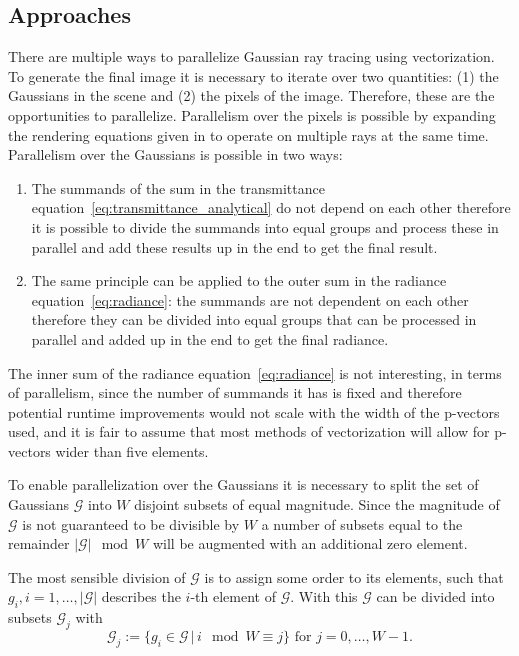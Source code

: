 \documentclass[a4paper, 11pt]{memoir}
\begin{document}
    \subsection{Approaches}
    There are multiple ways to parallelize Gaussian ray tracing using vectorization. To generate the final image it is necessary to iterate
    over two quantities: (1) the Gaussians in the scene and (2) the pixels of the image. Therefore, these are the opportunities to parallelize.
    Parallelism over the pixels is possible by expanding the rendering equations given in \cite{Rhodin:2015} to operate on multiple rays at the
    same time. Parallelism over the Gaussians is possible in two ways:
    \begin{enumerate}
        \item The summands of the sum in the \gls{transmittance} equation~\eqref{eq:transmittance_analytical} do not depend on each
            other therefore it is possible to divide the summands into equal groups and process these in parallel
            and add these results up in the end to get the final result.
        \item The same principle can be applied to the outer sum in the \gls{radiance} equation~\eqref{eq:radiance}: the summands are
            not dependent on each other therefore they can be divided into equal groups that can
            be processed in parallel and added up in the end to get the final \gls{radiance}.
    \end{enumerate}
    The inner sum of the \gls{radiance} equation~\eqref{eq:radiance} is not interesting, in terms of parallelism, since the number
    of summands it has is fixed and therefore potential runtime improvements would not scale with the width of the p-vectors used, and
    it is fair to assume that most methods of vectorization will allow for p-vectors wider than five elements.

    To enable parallelization over the Gaussians it is necessary to split the set of
    Gaussians $\mathcal{G}$ into $W$ disjoint subsets of equal magnitude. Since the magnitude of $\mathcal{G}$ is not guaranteed to be divisible by $W$
    a number of subsets equal to the remainder $|\mathcal{G}| \mod W$ will be augmented with an additional zero element.

    The most sensible division of $\mathcal{G}$ is to assign some order to its elements, such that $g_i, i=1,\dots,|\mathcal{G}|$ describes the $i$-th element of
    $\mathcal{G}$. With this $\mathcal{G}$ can be divided into subsets $\mathcal{G}_j$ with
    \begin{equation}
        \mathcal{G}_j := \{ g_i \in \mathcal{G} \,|\, i \mod W \equiv j \} \text{ for } j=0,\dots,W-1.
    \end{equation}
\end{document}

